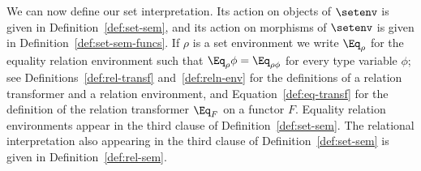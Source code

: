\documentclass{lmcs}
\theoremstyle{plain}\newtheorem{satz}[thm]{Satz}
\begin{document}
We can now define our set interpretation. Its action on objects of
$\setenv$ is given in Definition~\ref{def:set-sem}, and its action on
morphisms of $\setenv$ is given in Definition~\ref{def:set-sem-funcs}.
If $\rho$ is a set environment we write $\Eq_\rho$ for the equality
relation environment such that $\Eq_\rho \phi = \Eq_{\rho \phi}$ for
every type variable $\phi$; see Definitions~\ref{def:rel-transf}
and~\ref{def:reln-env} for the definitions of a relation transformer
and a relation environment, and Equation~\ref{def:eq-transf} for the
definition of the relation transformer $\Eq_F$ on a functor $F$.
Equality relation environments appear in the third clause of
Definition~\ref{def:set-sem}.  The relational interpretation also
appearing in the third clause of Definition~\ref{def:set-sem} is
given in Definition~\ref{def:rel-sem}.
\end{document}
